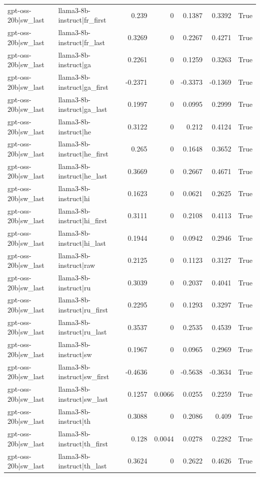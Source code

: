 \begin{table}
\begin{tabular}{l l r r r r l}
gpt-oss-20b|sw_last & llama3-8b-instruct|fr_first & 0.239 & 0 & 0.1387 & 0.3392 & True \\
gpt-oss-20b|sw_last & llama3-8b-instruct|fr_last & 0.3269 & 0 & 0.2267 & 0.4271 & True \\
gpt-oss-20b|sw_last & llama3-8b-instruct|ga & 0.2261 & 0 & 0.1259 & 0.3263 & True \\
gpt-oss-20b|sw_last & llama3-8b-instruct|ga_first & -0.2371 & 0 & -0.3373 & -0.1369 & True \\
gpt-oss-20b|sw_last & llama3-8b-instruct|ga_last & 0.1997 & 0 & 0.0995 & 0.2999 & True \\
gpt-oss-20b|sw_last & llama3-8b-instruct|he & 0.3122 & 0 & 0.212 & 0.4124 & True \\
gpt-oss-20b|sw_last & llama3-8b-instruct|he_first & 0.265 & 0 & 0.1648 & 0.3652 & True \\
gpt-oss-20b|sw_last & llama3-8b-instruct|he_last & 0.3669 & 0 & 0.2667 & 0.4671 & True \\
gpt-oss-20b|sw_last & llama3-8b-instruct|hi & 0.1623 & 0 & 0.0621 & 0.2625 & True \\
gpt-oss-20b|sw_last & llama3-8b-instruct|hi_first & 0.3111 & 0 & 0.2108 & 0.4113 & True \\
gpt-oss-20b|sw_last & llama3-8b-instruct|hi_last & 0.1944 & 0 & 0.0942 & 0.2946 & True \\
gpt-oss-20b|sw_last & llama3-8b-instruct|raw & 0.2125 & 0 & 0.1123 & 0.3127 & True \\
gpt-oss-20b|sw_last & llama3-8b-instruct|ru & 0.3039 & 0 & 0.2037 & 0.4041 & True \\
gpt-oss-20b|sw_last & llama3-8b-instruct|ru_first & 0.2295 & 0 & 0.1293 & 0.3297 & True \\
gpt-oss-20b|sw_last & llama3-8b-instruct|ru_last & 0.3537 & 0 & 0.2535 & 0.4539 & True \\
gpt-oss-20b|sw_last & llama3-8b-instruct|sw & 0.1967 & 0 & 0.0965 & 0.2969 & True \\
gpt-oss-20b|sw_last & llama3-8b-instruct|sw_first & -0.4636 & 0 & -0.5638 & -0.3634 & True \\
gpt-oss-20b|sw_last & llama3-8b-instruct|sw_last & 0.1257 & 0.0066 & 0.0255 & 0.2259 & True \\
gpt-oss-20b|sw_last & llama3-8b-instruct|th & 0.3088 & 0 & 0.2086 & 0.409 & True \\
gpt-oss-20b|sw_last & llama3-8b-instruct|th_first & 0.128 & 0.0044 & 0.0278 & 0.2282 & True \\
gpt-oss-20b|sw_last & llama3-8b-instruct|th_last & 0.3624 & 0 & 0.2622 & 0.4626 & True \\

\end{tabular}
\end{table}
